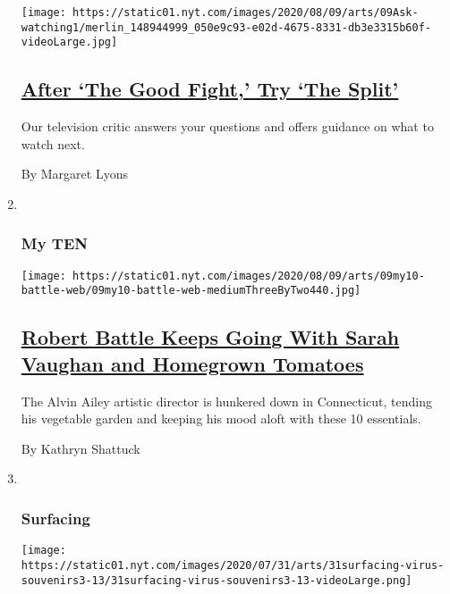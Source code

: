 \begin{enumerate}
  \texttt{[image: https://static01.nyt.com/images/2020/08/09/arts/09Ask-watching1/merlin\_148944999\_050e9c93-e02d-4675-8331-db3e3315b60f-videoLarge.jpg]}

  \hypertarget{after-the-good-fight-try-the-split}{%
  \subsection{\texorpdfstring{\href{/2020/08/04/arts/television/the-good-fight-the-split.html}{After
  `The Good Fight,' Try `The
  Split'}}{After `The Good Fight,' Try `The Split'}}\label{after-the-good-fight-try-the-split}}

  Our television critic answers your questions and offers guidance on
  what to watch next.

  By Margaret Lyons
\item ~
  \hypertarget{my-ten}{%
  \subsubsection{My TEN}\label{my-ten}}

  \texttt{[image: https://static01.nyt.com/images/2020/08/09/arts/09my10-battle-web/09my10-battle-web-mediumThreeByTwo440.jpg]}

  \hypertarget{robert-battle-keeps-going-with-sarah-vaughan-and-homegrown-tomatoes}{%
  \subsection{\texorpdfstring{\href{/2020/08/04/arts/dance/robert-battle-favorites.html}{Robert
  Battle Keeps Going With Sarah Vaughan and Homegrown
  Tomatoes}}{Robert Battle Keeps Going With Sarah Vaughan and Homegrown Tomatoes}}\label{robert-battle-keeps-going-with-sarah-vaughan-and-homegrown-tomatoes}}

  The Alvin Ailey artistic director is hunkered down in Connecticut,
  tending his vegetable garden and keeping his mood aloft with these 10
  essentials.

  By Kathryn Shattuck
\item ~
  \hypertarget{surfacing}{%
  \subsubsection{Surfacing}\label{surfacing}}

  \texttt{[image: https://static01.nyt.com/images/2020/07/31/arts/31surfacing-virus-souvenirs3-13/31surfacing-virus-souvenirs3-13-videoLarge.png]}


\end{enumerate}
